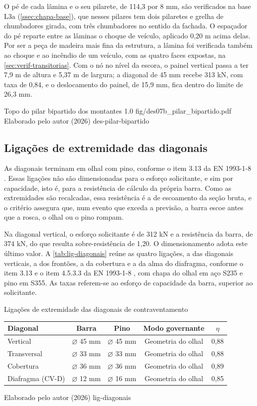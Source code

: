 O pé de cada lâmina e o seu pilarete, de 114,3 por 8 mm, são verificados na base
L3a (\autoref{ssec:chapa-base}), que nesses pilares tem dois pilaretes e
grelha de chumbadores girada, com três chumbadores no sentido da fachada. O
espaçador do pé reparte entre as lâminas o choque de veículo, aplicado 0,20 m
acima delas. Por ser a peça de madeira mais fina da estrutura, a lâmina foi
verificada também ao choque e ao incêndio de um veículo, com as quatro faces
expostas, na \autoref{sec:verif-transitorias}. Com o nó no nível da escora, o painel vertical passa a ter 7,9 m de
altura e 5,37 m de largura; a diagonal de 45 mm recebe 313 kN, com taxa de 0,84,
e o deslocamento do painel, de 15,9 mm, fica dentro do limite de 26,3 mm.

\figura
{Topo do pilar bipartido dos montantes}
{1.0}
{fig/des07b_pilar_bipartido.pdf}
{Elaborado pelo autor (2026)}
{des-pilar-bipartido}
{}
{}

\subsection{Ligações de extremidade das diagonais}\label{ssec:lig-diagonais}

As diagonais terminam em olhal com pino, conforme o item 3.13 da
EN 1993-1-8 \cite{EN1993-1-8:2005}. Essas ligações não são dimensionadas para o
esforço solicitante, e sim por capacidade, isto é, para a resistência de cálculo
da própria barra. Como as extremidades são recalcadas, essa resistência é a de
escoamento da seção bruta, e o critério assegura que, num evento que exceda a
previsão, a barra escoe antes que a rosca, o olhal ou o pino rompam.

Na diagonal vertical, o esforço solicitante é de 312 kN e a resistência da
barra, de 374 kN, do que resulta sobre-resistência de 1,20. O
dimensionamento adota este último valor. A \autoref{tab:lig-diagonais} reúne as
quatro ligações, a das diagonais verticais, a dos frontões, a da cobertura e a da
alma do diafragma,
conforme o item 3.13 e o item 4.5.3.3 da
EN 1993-1-8 \cite{EN1993-1-8:2005}, com chapa do olhal em aço S235 e pino em
S355. As taxas referem-se ao esforço de capacidade da barra, superior ao
solicitante.

\tabela
{Ligações de extremidade das diagonais de contraventamento}
{\footnotesize
\begin{tabular}{lcccc}
\toprule
    \textbf{Diagonal} & \textbf{Barra} & \textbf{Pino} & \textbf{Modo governante} & \textbf{$\eta$} \\
\midrule
    Vertical    & $\varnothing$ 45 mm & $\varnothing$ 45 mm & Geometria do olhal & 0,88 \\
    Transversal & $\varnothing$ 33 mm & $\varnothing$ 33 mm & Geometria do olhal & 0,88 \\
    Cobertura   & $\varnothing$ 36 mm & $\varnothing$ 36 mm & Geometria do olhal & 0,89 \\
    Diafragma (CV-D) & $\varnothing$ 12 mm & $\varnothing$ 16 mm & Geometria do olhal & 0,85 \\
\bottomrule
\end{tabular}}
{Elaborado pelo autor (2026)}
{lig-diagonais}
{}
{}

